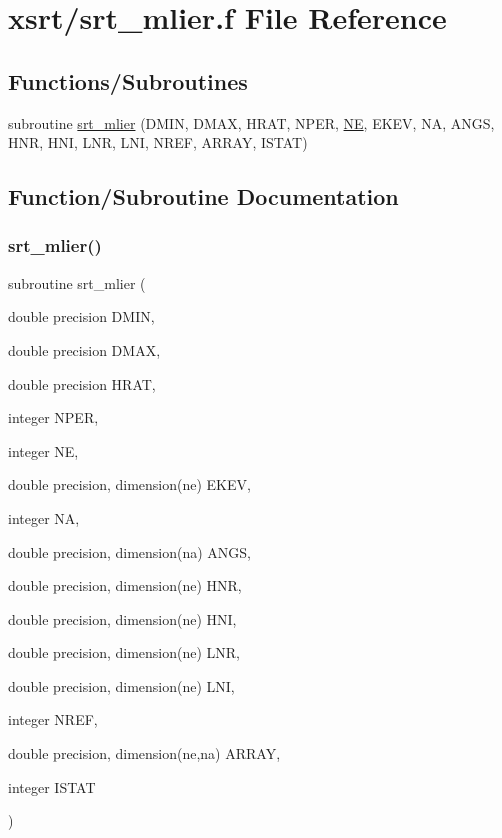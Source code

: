 \hypertarget{srt__mlier_8f}{}\section{xsrt/srt\+\_\+mlier.f File Reference}
\label{srt__mlier_8f}
\subsection*{Functions/\+Subroutines}
\begin{DoxyCompactItemize}
\item 
subroutine \hyperlink{srt__mlier_8f_a8e00cff79bafe8b237862ee971989a5c}{srt\+\_\+mlier} (D\+M\+IN, D\+M\+AX, H\+R\+AT, N\+P\+ER, \hyperlink{eval__tab_8h_a5af9139e882aef6c820ae908589a40d6}{NE}, E\+K\+EV, NA, A\+N\+GS, H\+NR, H\+NI, L\+NR, L\+NI, N\+R\+EF, A\+R\+R\+AY, I\+S\+T\+AT)
\end{DoxyCompactItemize}


\subsection{Function/\+Subroutine Documentation}
\mbox{\label{srt__mlier_8f_a8e00cff79bafe8b237862ee971989a5c}} 
\subsubsection{\texorpdfstring{srt\+\_\+mlier()}{srt\_mlier()}}
{\footnotesize\ttfamily subroutine srt\+\_\+mlier (\begin{DoxyParamCaption}\item[{double precision}]{D\+M\+IN,  }\item[{double precision}]{D\+M\+AX,  }\item[{double precision}]{H\+R\+AT,  }\item[{integer}]{N\+P\+ER,  }\item[{integer}]{NE,  }\item[{double precision, dimension(ne)}]{E\+K\+EV,  }\item[{integer}]{NA,  }\item[{double precision, dimension(na)}]{A\+N\+GS,  }\item[{double precision, dimension(ne)}]{H\+NR,  }\item[{double precision, dimension(ne)}]{H\+NI,  }\item[{double precision, dimension(ne)}]{L\+NR,  }\item[{double precision, dimension(ne)}]{L\+NI,  }\item[{integer}]{N\+R\+EF,  }\item[{double precision, dimension(ne,na)}]{A\+R\+R\+AY,  }\item[{integer}]{I\+S\+T\+AT }\end{DoxyParamCaption})}

